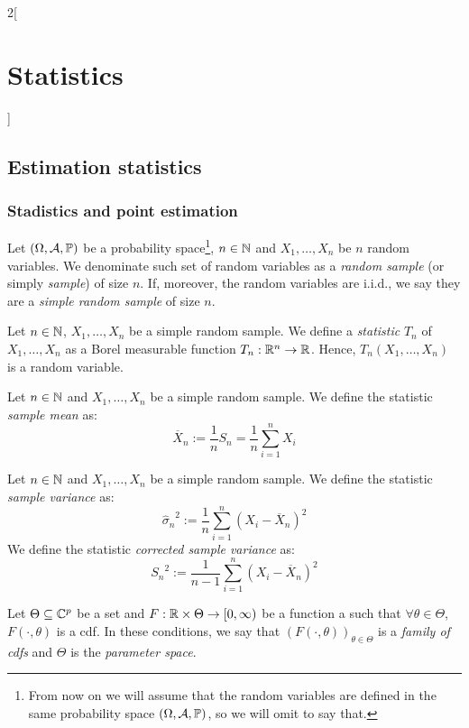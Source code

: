 \documentclass[../../../main.tex]{subfiles}
\begin{document}
\begin{multicols}{2}[\section{Statistics}]
  \subsection{Estimation statistics}
  \subsubsection{Stadistics and point estimation}
  \begin{definition}
    Let $(\Omega,\mathcal{A},\mathbb{P})$ be a probability space\footnote{From now on we will assume that the random variables are defined in the same probability space $(\Omega,\mathcal{A},\mathbb{P})$, so we will omit to say that.}, $n\in\mathbb{N}$ and $X_1,\ldots,X_n$ be $n$ random variables. We denominate such set of random variables as a \emph{random sample} (or simply \emph{sample}) of size $n$. If, moreover, the random variables are i.i.d., we say they are a \emph{simple random sample} of size $n$.
  \end{definition}
  \begin{definition}
    Let $n\in\mathbb{N}$, $X_1,\ldots,X_n$ be a simple random sample. We define a \emph{statistic} $T_n$ of $X_1,\ldots,X_n$ as a Borel measurable function $T_n:\mathbb{R}^n\rightarrow\mathbb{R}$. Hence, $T_n(X_1,\ldots,X_n)$ is a random variable.
  \end{definition}
  \begin{definition}
    Let $n\in\mathbb{N}$ and $X_1,\ldots,X_n$ be a simple random sample. We define the statistic \emph{sample mean} as: $$\overline{X}_n:=\frac{1}{n}S_n=\frac{1}{n}\sum_{i=1}^nX_i$$
  \end{definition}
  \begin{definition}
    Let $n\in\mathbb{N}$ and $X_1,\ldots,X_n$ be a simple random sample. We define the statistic \emph{sample variance} as: $${{\hat{\sigma}}_n}^2:=\frac{1}{n}\sum_{i=1}^n{(X_i-\overline{X}_n)}^2$$ We define the statistic \emph{corrected sample variance} as: $${S_n}^2:=\frac{1}{n-1}\sum_{i=1}^n{(X_i-\overline{X}_n)}^2$$
  \end{definition}
  \begin{definition}
    Let $\Theta\subseteq\mathbb{C}^p$ be a set and $F:\mathbb{R}\times\Theta\rightarrow[0,\infty)$ be a function a such that $\forall \theta\in\Theta$, $F(\cdot,\theta)$ is a cdf. In these conditions, we say that $(F(\cdot,\theta))_{\theta\in\Theta}$ is a \emph{family of cdfs} and $\Theta$ is the \emph{parameter space}.

\end{definition}
\end{multicols}
\end{document}
